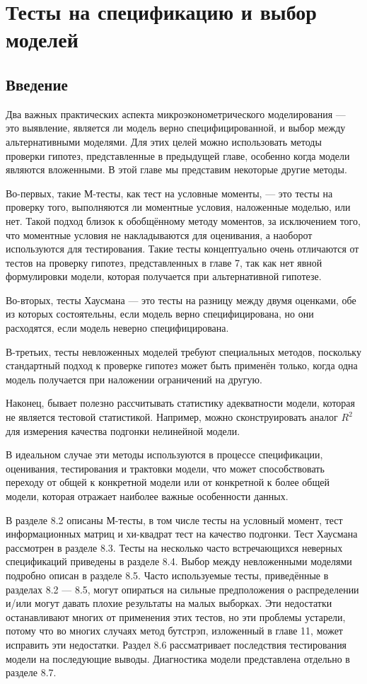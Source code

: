 
\chapter{Тесты на спецификацию и выбор моделей}
\section{Введение}

Два важных практических аспекта микроэконометрического моделирования --- это выявление, является ли модель верно специфицированной, и выбор между альтернативными моделями. Для этих целей можно использовать методы проверки гипотез, представленные в предыдущей главе, особенно когда модели являются вложенными. В этой главе мы представим некоторые другие методы.

Во-первых, такие М-тесты, как тест на условные моменты, --- это тесты на проверку того, выполняются ли моментные условия, наложенные моделью, или нет. Такой подход близок к обобщённому методу моментов, за исключением того, что моментные условия не накладываются для оценивания, а наоборот используются для тестирования. Такие тесты концептуально очень отличаются от тестов на проверку гипотез, представленных в главе 7, так как нет явной формулировки модели, которая получается при альтернативной гипотезе.

Во-вторых, тесты Хаусмана --- это тесты на разницу между двумя оценками, обе из которых состоятельны, если модель верно специфицирована, но они расходятся, если модель неверно специфицирована.

В-третьих, тесты невложенных моделей требуют специальных методов, поскольку стандартный подход к проверке гипотез может быть применён только, когда одна модель получается при наложении ограничений на другую.

Наконец, бывает полезно рассчитывать статистику адекватности модели, которая не является тестовой статистикой. Например, можно сконструировать аналог $R^2$ для измерения качества подгонки нелинейной модели.

В идеальном случае эти методы используются в процессе спецификации, оценивания, тестирования и трактовки модели, что может способствовать переходу от общей к конкретной модели или от конкретной к более общей модели, которая отражает наиболее важные особенности данных.

В разделе 8.2 описаны М-тесты, в том числе тесты на условный момент, тест информационных матриц и хи-квадрат тест на качество подгонки. Тест Хаусмана рассмотрен в разделе 8.3. Тесты на несколько часто встречающихся неверных спецификаций приведены в разделе 8.4. Выбор между невложенными моделями подробно описан в разделе 8.5. Часто используемые тесты, приведённые в разделах 8.2 --- 8.5, могут опираться на сильные предположения о распределении и/или могут давать плохие результаты на малых выборках. Эти недостатки останавливают многих от применения этих тестов, но эти проблемы устарели, потому что во многих случаях метод бутстрэп, изложенный в главе 11, может исправить эти недостатки. Раздел 8.6 рассматривает последствия тестирования модели на последующие выводы. Диагностика модели представлена отдельно в разделе 8.7.

